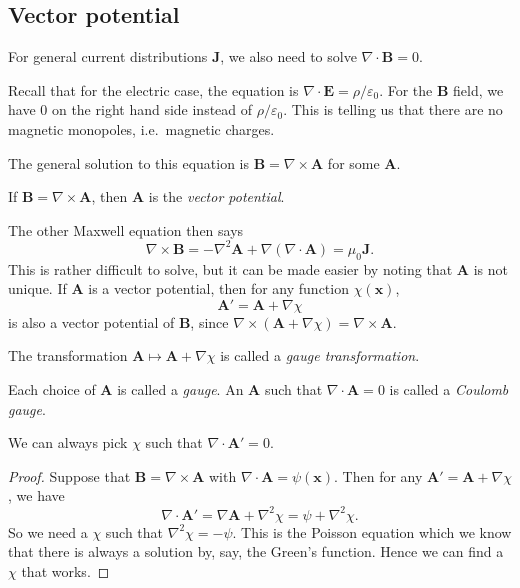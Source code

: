 \documentclass[a4paper]{article}
\begin{document}
\subsection{Vector potential}
For general current distributions $\mathbf{J}$, we also need to solve $\nabla \cdot \mathbf{B} = 0$.

Recall that for the electric case, the equation is $\nabla\cdot \mathbf{E} = \rho/\varepsilon_0$. For the $\mathbf{B}$ field, we have $0$ on the right hand side instead of $\rho/\varepsilon_0$. This is telling us that there are no magnetic monopoles, i.e.\ magnetic charges.

The general solution to this equation is $\mathbf{B} = \nabla \times \mathbf{A}$ for some $\mathbf{A}$.
\begin{defi}
  If $\mathbf{B} = \nabla\times \mathbf{A}$, then $\mathbf{A}$ is the \emph{vector potential}.
\end{defi}
The other Maxwell equation then says
\[
  \nabla \times \mathbf{B} = -\nabla^2 \mathbf{A} + \nabla(\nabla\cdot \mathbf{A}) = \mu_0 \mathbf{J}.\tag{$*$}
\]
This is rather difficult to solve, but it can be made easier by noting that $\mathbf{A}$ is not unique. If $\mathbf{A}$ is a vector potential, then for any function $\chi(\mathbf{x})$,
\[
  \mathbf{A}' = \mathbf{A} + \nabla \chi
\]
is also a vector potential of $\mathbf{B}$, since $\nabla \times (\mathbf{A} + \nabla \chi) = \nabla \times \mathbf{A}$.

The transformation $\mathbf{A} \mapsto \mathbf{A} + \nabla\chi$ is called a \emph{gauge transformation}.

\begin{defi}
  Each choice of $\mathbf{A}$ is called a \emph{gauge}. An $\mathbf{A}$ such that $\nabla \cdot \mathbf{A} = 0$ is called a \emph{Coulomb gauge}.
\end{defi}

\begin{prop}
  We can always pick $\chi$ such that $\nabla \cdot \mathbf{A}' = 0$.
\end{prop}

\begin{proof}
  Suppose that $\mathbf{B} = \nabla \times \mathbf{A}$ with $\nabla \cdot \mathbf{A} = \psi(\mathbf{x})$. Then for any $\mathbf{A}' = \mathbf{A} + \nabla \chi$, we have
  \[
    \nabla \cdot \mathbf{A}' = \nabla \mathbf{A} + \nabla^2 \chi = \psi + \nabla^2\chi.
  \]
  So we need a $\chi$ such that $\nabla^2\chi = -\psi$. This is the Poisson equation which we know that there is always a solution by, say, the Green's function. Hence we can find a $\chi$ that works.
\end{proof}
\end{document}
